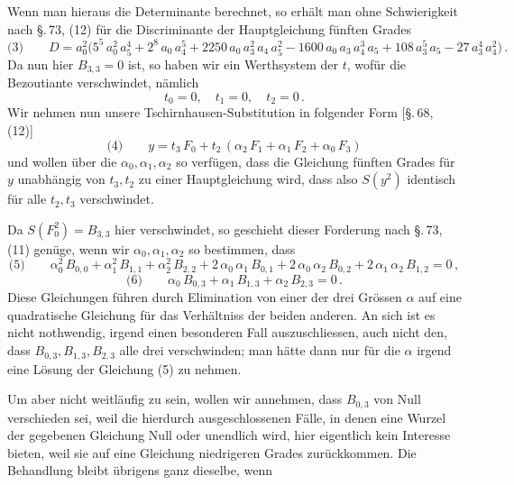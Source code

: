 

Wenn man hieraus die Determinante berechnet, so erhält
man ohne Schwierigkeit nach \S.\,73, (12) für die Discriminante
der Hauptgleichung fünften Grades
\[
\text{(3)} \qquad D = a_0^2\bigl(5^5\,a_0^2\,a_5^4 + 2^8\,a_0\,a_4^5 + 2250\,a_0\,a_3^2\,a_4\,a_5^2
- 1600\,a_0\,a_3\,a_4^3\,a_5 + 108\,a_3^5\,a_5 - 27\,a_3^4\,a_4^2\bigr)\,.
\]
Da nun hier $B_{3,3} = 0$ ist, so haben wir ein Werthsystem
der $t$, wofür die Bezoutiante verschwindet, nämlich
\[
t_0 = 0, \quad t_1 = 0, \quad t_2 = 0\,.
\]
Wir nehmen nun unsere Tschirnhausen-Substitution in folgender Form [\S.\,68, (12)]
\[
\text{(4)} \qquad y = t_3\,F_0 + t_2\,(\alpha_2\,F_1 + \alpha_1\,F_2 + \alpha_0\,F_3)
\]
und wollen über die $\alpha_0, \alpha_1, \alpha_2$ so verfügen, dass die Gleichung
fünften Grades für $y$ unabhängig von $t_3, t_2$ zu einer Hauptgleichung wird, dass also $S(y^2)$ identisch für alle $t_2, t_3$ verschwindet.

\indent Da $S(F_0^2) = B_{3,3}$ hier verschwindet, so geschieht dieser
Forderung nach \S.\,73, (11) genüge, wenn wir $\alpha_0, \alpha_1, \alpha_2$ so bestimmen, dass
\[
\text{(5)} \qquad \alpha_0^2\,B_{0,0} + \alpha_1^2\,B_{1,1} + \alpha_2^2\,B_{2,2}
+ 2\,\alpha_0\,\alpha_1\,B_{0,1} + 2\,\alpha_0\,\alpha_2\,B_{0,2} + 2\,\alpha_1\,\alpha_2\,B_{1,2} = 0\,,
\]
\[
\text{(6)} \qquad \alpha_0\,B_{0,3} + \alpha_1\,B_{1,3} + \alpha_2\,B_{2,3} = 0\,.
\]
Diese Gleichungen führen durch Elimination von einer der
drei Grössen $\alpha$ auf eine quadratische Gleichung für das Verhältniss der beiden anderen. An sich ist es nicht nothwendig,
irgend einen besonderen Fall auszuschliessen, auch nicht den,
dass $B_{0,3}, B_{1,3}, B_{2,3}$ alle drei verschwinden; man hätte dann nur
für die $\alpha$ irgend eine Lösung der Gleichung (5) zu nehmen.

\indent Um aber nicht weitläufig zu sein, wollen wir annehmen,
dass $B_{0,3}$ von Null verschieden sei, weil die hierdurch ausgeschlossenen Fälle, in denen eine Wurzel der gegebenen Gleichung Null oder unendlich wird, hier eigentlich kein Interesse
bieten, weil sie auf eine Gleichung niedrigeren Grades zurückkommen. Die Behandlung bleibt übrigens ganz dieselbe, wenn
